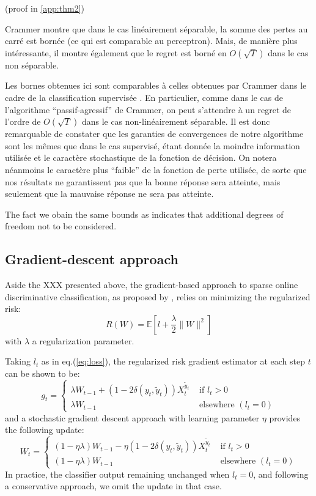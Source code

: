 \documentclass[preprint,12pt,authoryear]{elsarticle}
\begin{document}
(proof in \ref{app:thm2})

{\color{blue} Crammer montre que dans le cas linéairement séparable, la somme des pertes au carré est bornée (ce qui est comparable au perceptron). Mais, de manière plus intéressante, il montre également que le regret est borné en $O(\sqrt{T})$ dans le cas non séparable.}


Les bornes obtenues ici sont comparables  à celles obtenues par Crammer dans le cadre de la classification supervisée  \cite{crammer2006online}. En particulier, comme dans le cas de l'algorithme ``passif-agressif'' de Crammer, on peut s'attendre à un regret de l'ordre de $O(\sqrt{T})$ dans le cas non-linéairement séparable. Il est donc remarquable de constater que les garanties de convergences de notre algorithme sont les mêmes que dans le cas supervisé, étant donnée la moindre information utilisée et le caractère stochastique de la fonction de décision. On notera néanmoins le caractère plus ``faible'' de la fonction de perte utilisée, de sorte que nos résultats ne garantissent pas que la bonne réponse sera atteinte, mais seulement que la mauvaise réponse ne sera pas atteinte.

The fact we obain the same bounds as \cite{crammer2006online} indicates that additional degrees of freedom not to be considered.   

\subsection{Gradient-descent approach}

Aside the XXX presented above, the gradient-based approach to sparse online discriminative classification, as proposed by \cite{kivinen2004online}, relies on minimizing the regularized risk:
$$R(W) = \mathbb{E}\left[ l + \frac{\lambda}{2}\|W\|^2\right]$$
with $\lambda$ a regularization parameter.

Taking $l_t$ as in eq.(\ref{eq:loss}), the regularized risk gradient estimator at each step $t$ can be shown to be:
$$g_t = \left\{
\begin{array}{ll}
\lambda W_{t-1} + (1 - 2 \delta(y_t,\tilde{y}_t)) X_t^{\tilde{y}_t} &\text{ if } l_t > 0\\
\lambda W_{t-1} &\text{ elsewhere }(l_t=0)
\end{array}
\right.$$
and a stochastic gradient descent approach with learning parameter $\eta$ provides the following update:
$$W_t =  \left\{
\begin{array}{ll}
(1-\eta\lambda) W_{t-1} - \eta (1 - 2 \delta(y_t,\tilde{y}_t)) X_t^{\tilde{y}_t} &\text{ if } l_t > 0\\
(1-\eta\lambda) W_{t-1} &\text{ elsewhere }(l_t = 0)
\end{array}
\right.$$
In practice, the classifier output remaining unchanged when $l_t = 0$, and following a conservative approach, we omit the update in that case. 
\end{document}
